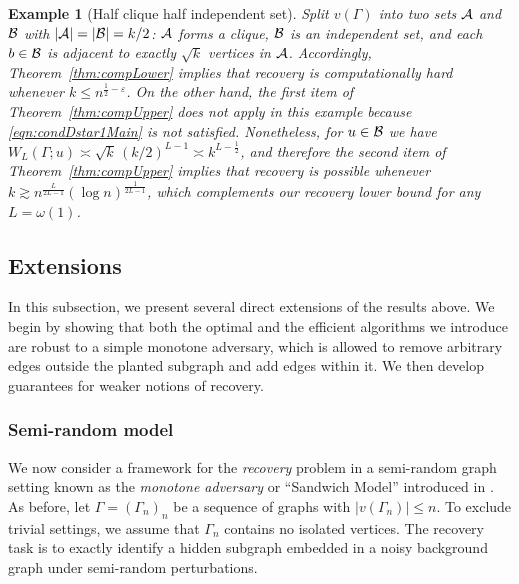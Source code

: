 \documentclass[12pt]{article}
\newtheorem{example}{Example}
\newcommand{\calA}{{\cal A}}
\newcommand{\calB}{{\cal B}}
\begin{document}
\begin{example}[Half clique half independent set]
Split $v(\Gamma)$ into two sets $\calA$ and $\calB$ with $|\calA| = |\calB| = k/2$: $\calA$ forms a clique, $\calB$ is an independent set, and each $b \in \calB$ is adjacent to exactly $\sqrt{k}$ vertices in $\calA$. Accordingly, Theorem~\ref{thm:compLower} implies that recovery is computationally hard whenever $k \leq n^{\frac{1}{2}-\varepsilon}$. On the other hand, the first item of Theorem~\ref{thm:compUpper} does not apply in this example because \eqref{eqn:condDstar1Main} is not satisfied. Nonetheless, for $u \in \calB$ we have
$W_L(\Gamma;u) \asymp \sqrt{k}\,(k/2)^{L-1} \asymp k^{L-\tfrac{1}{2}}$, and therefore the second item of Theorem~\ref{thm:compUpper} implies that recovery is possible whenever $k \gtrsim n^{\tfrac{L}{2L-1}} (\log n)^{\tfrac{1}{2L-1}}$, which complements our recovery lower bound for any $L = \omega(1)$.
\end{example}

\subsection{Extensions}\label{subsec:exten}

In this subsection, we present several direct extensions of the results above. We begin by showing that both the optimal and the efficient algorithms we introduce are robust to a simple monotone adversary, which is allowed to remove arbitrary edges outside the planted subgraph and add edges within it. We then develop guarantees for weaker notions of recovery.

\subsubsection{Semi-random model}

We now consider a framework for the \emph{recovery} problem in a semi-random graph setting known as the \emph{monotone adversary} or ``Sandwich Model'' introduced in \cite{feige2000finding}. As before, let $\Gamma = (\Gamma_n)_n$ be a sequence of graphs with $|v(\Gamma_n)| \leq n$. To exclude trivial settings, we assume that $\Gamma_n$ contains no isolated vertices. The recovery task is to exactly identify a hidden subgraph embedded in a noisy background graph under semi-random perturbations.
\end{document}
